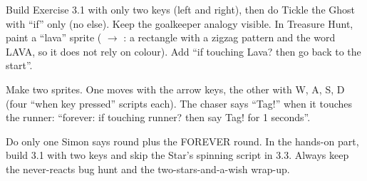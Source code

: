 \begin{differentiation}
\supportpath Build Exercise 3.1 with only two keys (left and right), then do Tickle the Ghost with \enquote{if} only (no else). Keep the goalkeeper analogy visible.
\extensionpath In Treasure Hunt, paint a \enquote{lava} sprite ( $\rightarrow$ : a rectangle with a zigzag pattern and the word LAVA, so it does not rely on colour). Add \enquote{if touching Lava? then go back to the start}.
\end{differentiation}

\begin{stretchchallenge}
Make two sprites. One moves with the arrow keys, the other with W, A, S, D (four \enquote{when key pressed} scripts each). The chaser says \enquote{Tag!} when it touches the runner: \enquote{forever: if touching runner? then say Tag! for 1 seconds}.
\end{stretchchallenge}

\begin{teachernote}
Do only one Simon says round plus the FOREVER round. In the hands-on part, build 3.1 with two keys and skip the Star's spinning script in 3.3. Always keep the never-reacts bug hunt and the two-stars-and-a-wish wrap-up.
\end{teachernote}
